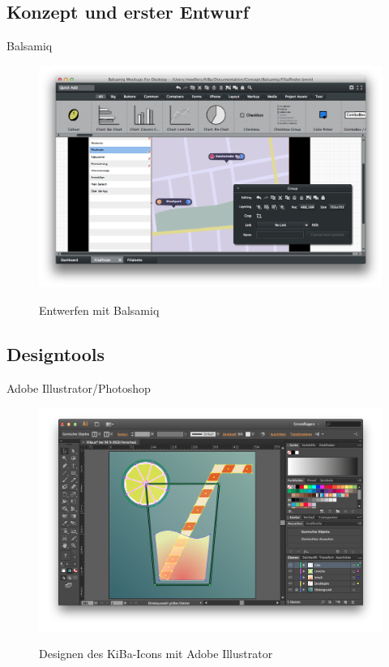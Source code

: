 \subsection{Konzept und erster Entwurf}
Balsamiq
\begin{figure}
	\centering
	\includegraphics[scale=.3]{Pictures/BalsamiqEntwurf}
	\label{fig:BalsamiqEntwurf}
	\caption{Entwerfen mit Balsamiq}
\end{figure}

\subsection{Designtools}
Adobe Illustrator/Photoshop
\begin{figure}
	\centering
	\includegraphics[scale=.3]{Pictures/IllustratorIcon}
	\label{fig:IllustratorIcon}
	\caption{Designen des KiBa-Icons mit Adobe Illustrator}
\end{figure}
